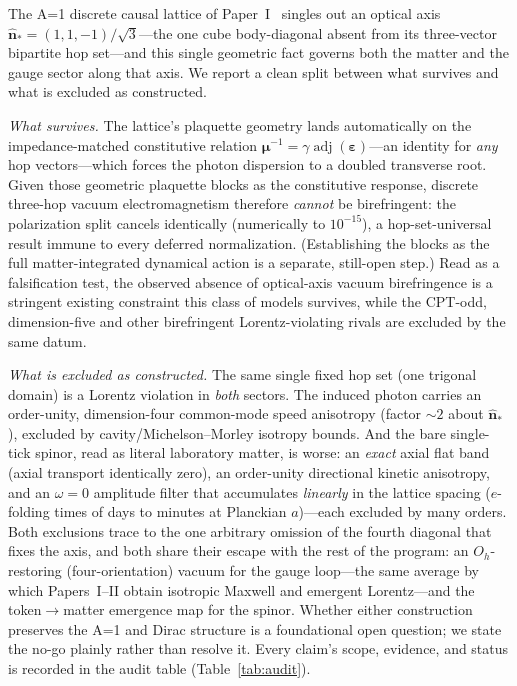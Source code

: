 The A=1 discrete causal lattice of Paper~I~\cite{menendez2026geometryfirst} singles
out an optical axis $\hat{\mathbf{n}}_* = (1,1,-1)/\sqrt3$---the one cube body-diagonal
absent from its three-vector bipartite hop set---and this single geometric fact governs
both the matter and the gauge sector along that axis. We report a clean split between
what survives and what is excluded as constructed.

\emph{What survives.} The lattice's plaquette geometry lands automatically on the
impedance-matched constitutive relation $\boldsymbol{\mu}^{-1} =
\gamma\operatorname{adj}(\boldsymbol{\varepsilon})$---an identity for \emph{any} hop
vectors---which forces the photon dispersion to a doubled transverse root. Given those geometric
plaquette blocks as the constitutive response, discrete three-hop vacuum electromagnetism
therefore \emph{cannot} be birefringent: the polarization split cancels identically
(numerically to $10^{-15}$), a hop-set-universal result immune to every deferred
normalization. (Establishing the blocks as the full matter-integrated dynamical action is
a separate, still-open step.) Read as a falsification test, the
observed absence of optical-axis vacuum birefringence is a stringent existing constraint
this class of models survives, while the CPT-odd, dimension-five and other birefringent
Lorentz-violating rivals are excluded by the same datum.

\emph{What is excluded as constructed.} The same single fixed hop set (one trigonal
domain) is a Lorentz violation in \emph{both} sectors. The induced photon carries an
order-unity, dimension-four common-mode speed anisotropy (factor $\sim2$ about
$\hat{\mathbf{n}}_*$), excluded by cavity/Michelson--Morley isotropy bounds. And the bare
single-tick spinor, read as literal laboratory matter, is worse: an \emph{exact} axial
flat band (axial transport identically zero), an order-unity directional kinetic
anisotropy, and an $\omega=0$ amplitude filter that accumulates \emph{linearly} in the
lattice spacing ($e$-folding times of days to minutes at Planckian $a$)---each excluded
by many orders. Both exclusions trace to the one arbitrary omission of the fourth
diagonal that fixes the axis, and both share their escape with the rest of the program:
an $O_h$-restoring (four-orientation) vacuum for the gauge loop---the same average by
which Papers~I--II obtain isotropic Maxwell and emergent Lorentz---and the
token$\to$matter emergence map for the spinor. Whether either construction preserves the
A=1 and Dirac structure is a foundational open question; we state the no-go plainly
rather than resolve it. Every claim's scope, evidence, and status is recorded in the
audit table (Table~\ref{tab:audit}).
